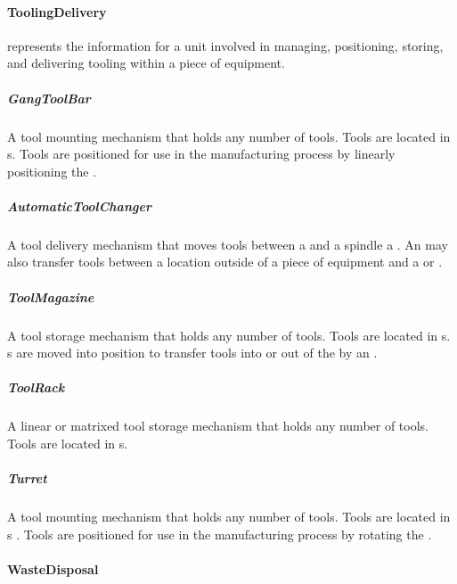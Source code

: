 \paragraph{ToolingDelivery}\mbox{}
\label{sec:ToolingDelivery}


 represents the information for a unit involved in managing, positioning, storing, and delivering tooling within a piece of equipment.




\subparagraph{GangToolBar}\mbox{}
\label{sec:GangToolBar}


A tool mounting mechanism that holds any number of tools. Tools are located in s. Tools are positioned for use in the manufacturing process by linearly positioning the .



\subparagraph{AutomaticToolChanger}\mbox{}
\label{sec:AutomaticToolChanger}


A tool delivery mechanism that moves tools between a  and a \gls{spindle} a . An  may also transfer tools between a location outside of a piece of equipment and a  or .



\subparagraph{ToolMagazine}\mbox{}
\label{sec:ToolMagazine}


A tool storage mechanism that holds any number of tools. Tools are located in s. s are moved into position to transfer tools into or out of the  by an .



\subparagraph{ToolRack}\mbox{}
\label{sec:ToolRack}


A linear or matrixed tool storage mechanism that holds any number of tools. Tools are located in s.



\subparagraph{Turret}\mbox{}
\label{sec:Turret}


A tool mounting mechanism that holds any number of tools. Tools are located in s . Tools are positioned for use in the manufacturing process by rotating the .



\paragraph{WasteDisposal}\mbox{}
\label{sec:WasteDisposal}


